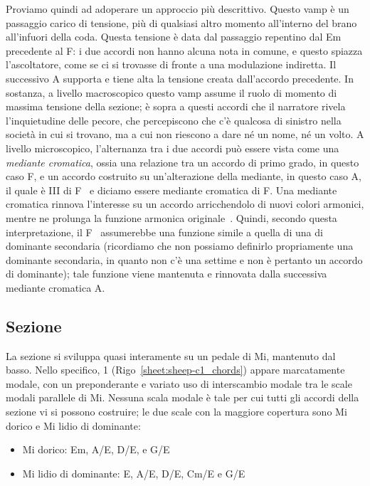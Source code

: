 \documentclass[class=book, crop=false, oneside, 12pt]{standalone}
\begin{document}
    Proviamo quindi ad adoperare un approccio più descrittivo. Questo vamp è un passaggio carico di tensione, più di qualsiasi altro momento all'interno del brano all'infuori della coda. Questa tensione è data dal passaggio repentino dal Em precedente al F\sharp : i due accordi non hanno alcuna nota in comune, e questo spiazza l'ascoltatore, come se ci si trovasse di fronte a una modulazione indiretta. Il successivo A supporta e tiene alta la tensione creata dall'accordo precedente. In sostanza, a livello macroscopico questo vamp assume il ruolo di momento di massima tensione della sezione; è sopra a questi accordi che il narratore rivela l'inquietudine delle pecore, che percepiscono che c'è qualcosa di sinistro nella società in cui si trovano, ma a cui non riescono a dare né un nome, né un volto. A livello microscopico, l'alternanza tra i due accordi può essere vista come una \emph{mediante cromatica}, ossia una relazione tra un accordo di primo grado, in questo caso F\sharp, e un accordo costruito su un'alterazione della mediante,  in questo caso A, il quale è \flat III di F\sharp~ e diciamo essere mediante cromatica di F\sharp. Una mediante cromatica rinnova l'interesse su un accordo arricchendolo di nuovi colori armonici, mentre ne prolunga la funzione armonica originale~\cite[12.2, p. 202]{benward2014music}. Quindi, secondo questa interpretazione, il F\sharp~ assumerebbe una funzione simile a quella di una di dominante secondaria (ricordiamo che non possiamo definirlo propriamente una dominante secondaria, in quanto non c'è una settime e non è pertanto un accordo di dominante); tale funzione viene mantenuta e rinnovata dalla successiva mediante cromatica A.


    \subsection{Sezione }
    La sezione  si sviluppa quasi interamente su un pedale di Mi, mantenuto dal basso. Nello specifico, 1 (Rigo~\ref{sheet:sheep-c1_chords}) appare marcatamente modale, con un preponderante e variato uso di interscambio modale tra le scale modali parallele di Mi. Nessuna scala modale è tale per cui tutti gli accordi della sezione vi si possono costruire; le due scale con la maggiore copertura sono Mi dorico e Mi lidio di dominante:
    \begin{itemize}
        \item Mi dorico: Em, A/E, D/E, e G/E
        \item Mi lidio di dominante: E, A/E, D/E, C\sharp m/E e G/E
    \end{itemize}
\end{document}
